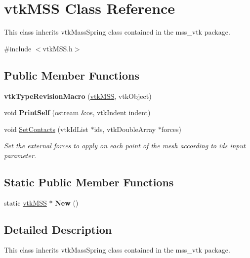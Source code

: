 \hypertarget{classvtkMSS}{
\section{vtkMSS Class Reference}
\label{classvtkMSS}
}


This class inherits vtkMassSpring class contained in the mss\_\-vtk package.  




{\ttfamily \#include $<$vtkMSS.h$>$}

\subsection*{Public Member Functions}
\begin{DoxyCompactItemize}
\item 
\hypertarget{classvtkMSS_a6b4921cd1f1f91d784a780a5b0b3d8a3}{
{\bfseries vtkTypeRevisionMacro} (\hyperlink{classvtkMSS}{vtkMSS}, vtkObject)}
\label{classvtkMSS_a6b4921cd1f1f91d784a780a5b0b3d8a3}

\item 
\hypertarget{classvtkMSS_ada7a068fef7b98254a77d7fc94125fc3}{
void {\bfseries PrintSelf} (ostream \&os, vtkIndent indent)}
\label{classvtkMSS_ada7a068fef7b98254a77d7fc94125fc3}

\item 
void \hyperlink{classvtkMSS_ae0e9fb2f2ecb8c118a6e20a21212362e}{SetContacts} (vtkIdList $\ast$ids, vtkDoubleArray $\ast$forces)
\begin{DoxyCompactList}\small\item\em Set the external forces to apply on each point of the mesh according to ids input parameter. \item\end{DoxyCompactList}\end{DoxyCompactItemize}
\subsection*{Static Public Member Functions}
\begin{DoxyCompactItemize}
\item 
\hypertarget{classvtkMSS_a058b3cd9e4e5aa3c7bc45fd5779dbead}{
static \hyperlink{classvtkMSS}{vtkMSS} $\ast$ {\bfseries New} ()}
\label{classvtkMSS_a058b3cd9e4e5aa3c7bc45fd5779dbead}

\end{DoxyCompactItemize}


\subsection{Detailed Description}
This class inherits vtkMassSpring class contained in the mss\_\-vtk package. 

